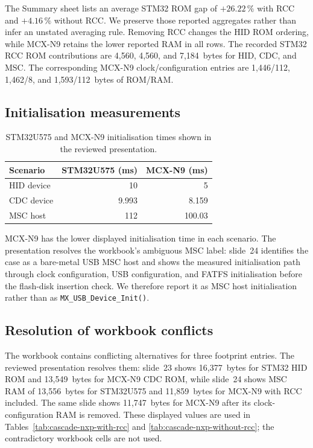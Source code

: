 The Summary sheet lists an average STM32 ROM gap of $+26.22\,\%$ with RCC and
$+4.16\,\%$ without RCC. We preserve those reported aggregates rather than infer an
unstated averaging rule. Removing RCC changes the HID ROM ordering, while MCX-N9 retains
the lower reported RAM in all rows. The recorded STM32 RCC ROM contributions are 4,560,
4,560, and 7,184~bytes for HID, CDC, and MSC. The corresponding MCX-N9 clock/configuration
entries are 1,446/112, 1,462/8, and 1,593/112~bytes of ROM/RAM.

\subsection{Initialisation measurements}

\begin{table}[H]
\centering
\small
\caption{STM32U575 and MCX-N9 initialisation times shown in the reviewed presentation.}
\label{tab:cascade-nxp-timing}
\begin{tabular}{lrr}
\toprule
Scenario & STM32U575 (ms) & MCX-N9 (ms) \\
\midrule
HID device & 10 & 5 \\
CDC device & 9.993 & 8.159 \\
MSC host & 112 & 100.03 \\
\bottomrule
\end{tabular}
\end{table}

MCX-N9 has the lower displayed initialisation time in each scenario. The presentation
resolves the workbook's ambiguous MSC label: slide~24 identifies the case as a bare-metal
USB MSC host and shows the measured initialisation path through clock configuration, USB
configuration, and FATFS initialisation before the flash-disk insertion check. We therefore
report it as MSC host initialisation rather than as \texttt{MX\_USB\_Device\_Init()}.

\subsection{Resolution of workbook conflicts}

The workbook contains conflicting alternatives for three footprint entries. The reviewed
presentation resolves them: slide~23 shows 16,377~bytes for STM32 HID ROM and
13,549~bytes for MCX-N9 CDC ROM, while slide~24 shows MSC RAM of 13,556~bytes for
STM32U575 and 11,859~bytes for MCX-N9 with RCC included. The same slide shows
11,747~bytes for MCX-N9 after its clock-configuration RAM is removed. These displayed
values are used in Tables~\ref{tab:cascade-nxp-with-rcc} and
\ref{tab:cascade-nxp-without-rcc}; the contradictory workbook cells are not used.

